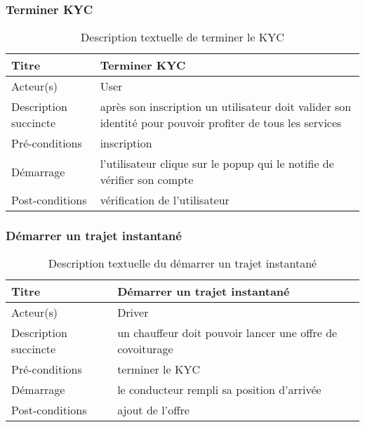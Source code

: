 \subsubsection{Terminer KYC} %
\begin{table}[H]
\begin{center}
    \begin{tabular}{ | l | p{10cm} |}
    \hline
    Titre & Terminer KYC \\ \hline
    Acteur(s) & User \\ \hline
    Description succincte & après son inscription un utilisateur doit valider son identité pour pouvoir profiter de tous les services \\ \hline
    Pré-conditions & inscription \\ \hline
    Démarrage & l'utilisateur clique sur le popup qui le notifie de vérifier son compte \\ \hline
    Post-conditions & vérification de l'utilisateur \\ \hline
    \end{tabular}
    \caption{Description textuelle de terminer le KYC}
\end{center}
\end{table}

\subsubsection{Démarrer un trajet instantané} %
\begin{table}[H]
\begin{center}
    \begin{tabular}{ | l | p{10cm} |}
    \hline
    Titre & Démarrer un trajet instantané \\ \hline
    Acteur(s) & Driver \\ \hline
    Description succincte & un chauffeur doit pouvoir lancer une offre de covoiturage \\ \hline
    Pré-conditions & terminer le KYC \\ \hline
    Démarrage & le conducteur rempli sa position d'arrivée \\ \hline
    Post-conditions & ajout de l'offre \\ \hline
    \end{tabular}
    \caption{Description textuelle du démarrer un trajet instantané}
\end{center}
\end{table}

